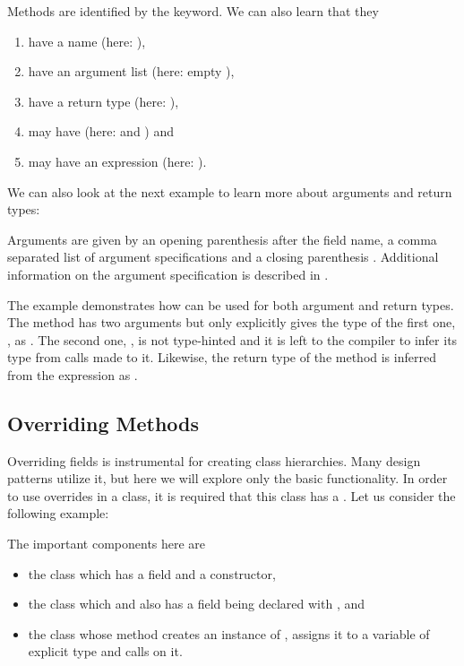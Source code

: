 \documentclass{haxe}
\begin{document}
Methods are identified by the  keyword. We can also learn that they

\begin{enumerate}
	\item have a name (here: ),
	\item have an argument list (here: empty \expr{()}),
	\item have a return type (here: ),
	\item may have  (here:  and ) and
	\item may have an expression (here: ).
\end{enumerate}

We can also look at the next example to learn more about arguments and return types:


Arguments are given by an opening parenthesis \expr{(} after the field name, a comma \expr{,} separated list of argument specifications and a closing parenthesis \expr{)}. Additional information on the argument specification is described in .

The example demonstrates how  can be used for both argument and return types. The method  has two arguments but only explicitly gives the type of the first one, , as . The second one, , is not type-hinted and it is left to the compiler to infer its type from calls made to it. Likewise, the return type of the method is inferred from the  expression as .

\subsection{Overriding Methods}
\label{class-field-overriding}

Overriding fields is instrumental for creating class hierarchies. Many design patterns utilize it, but here we will explore only the basic functionality. In order to use overrides in a class, it is required that this class has a . Let us consider the following example:


The important components here are

\begin{itemize}
	\item the class  which has a field  and a constructor,
	\item the class  which  and also has a field  being declared with , and
	\item the  class whose  method creates an instance of , assigns it to a variable  of explicit type  and calls  on it.
\end{itemize}
\end{document}
